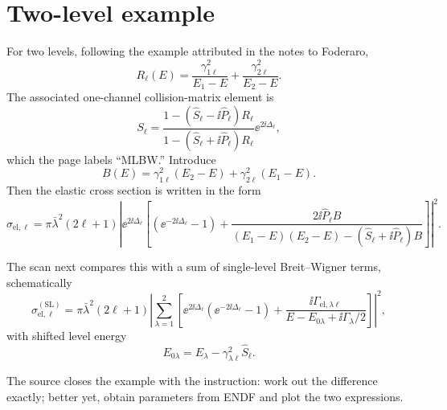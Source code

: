 \section{Two-level example}
For two levels, following the example attributed in the notes to Foderaro,
\begin{equation}
  R_\ell(E)=
  \frac{\gamma_{1\ell}^{2}}{E_1-E}
  +\frac{\gamma_{2\ell}^{2}}{E_2-E}.
  \label{eq:rmat-two-level-R}
\end{equation}
The associated one-channel collision-matrix element is
\begin{equation}
  S_\ell=
  \frac{1-(\widehat S_\ell-\ii\widehat P_\ell)R_\ell}
       {1-(\widehat S_\ell+\ii\widehat P_\ell)R_\ell}
  \ee^{2\ii\Delta_\ell},
  \label{eq:rmat-two-level-S}
\end{equation}
which the page labels ``MLBW.''  Introduce
\begin{equation}
  B(E)=
  \gamma_{1\ell}^{2}(E_2-E)
  +\gamma_{2\ell}^{2}(E_1-E).
  \label{eq:rmat-two-level-B}
\end{equation}
Then the elastic cross section is written in the form
\begin{equation}
  \sigma_{\mathrm{el},\ell}
  =\pi\bar\lambda^2(2\ell+1)
  \left|
  \ee^{2\ii\Delta_\ell}
  \left[
    \left(\ee^{-2\ii\Delta_\ell}-1\right)
    +\frac{2\ii\widehat P_\ell B}
    {(E_1-E)(E_2-E)
      -(\widehat S_\ell+\ii\widehat P_\ell)B}
  \right]
  \right|^2.
  \label{eq:rmat-two-level-xsec}
\end{equation}

The scan next compares this with a sum of single-level Breit--Wigner terms, schematically
\begin{equation}
  \sigma_{\mathrm{el},\ell}^{(\mathrm{SL})}
  =\pi\bar\lambda^2(2\ell+1)
  \left|
    \sum_{\lambda=1}^{2}
    \left[
      \ee^{2\ii\Delta_\ell}
      \left(\ee^{-2\ii\Delta_\ell}-1\right)
      +\frac{\ii\Gamma_{\mathrm{el},\lambda\ell}}
      {E-E_{0\lambda}+\ii\Gamma_\lambda/2}
    \right]
  \right|^2,
  \label{eq:rmat-two-level-slbw-comparison}
\end{equation}
with shifted level energy
\[
  E_{0\lambda}=E_\lambda-
  \gamma_{\lambda\ell}^{2}\widehat S_\ell.
\]

The source closes the example with the instruction: work out the difference exactly; better yet, obtain parameters from ENDF and plot the two expressions.

